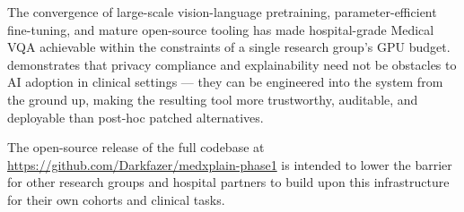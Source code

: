 The convergence of large-scale vision-language pretraining, parameter-efficient
fine-tuning, and mature open-source tooling has made hospital-grade Medical VQA
achievable within the constraints of a single research group's GPU budget.
\medxplain{} demonstrates that privacy compliance and explainability need not
be obstacles to AI adoption in clinical settings --- they can be engineered
into the system from the ground up, making the resulting tool more trustworthy,
auditable, and deployable than post-hoc patched alternatives.

The open-source release of the full codebase at
\url{https://github.com/Darkfazer/medxplain-phase1} is intended to lower
the barrier for other research groups and hospital partners to build upon
this infrastructure for their own cohorts and clinical tasks.
